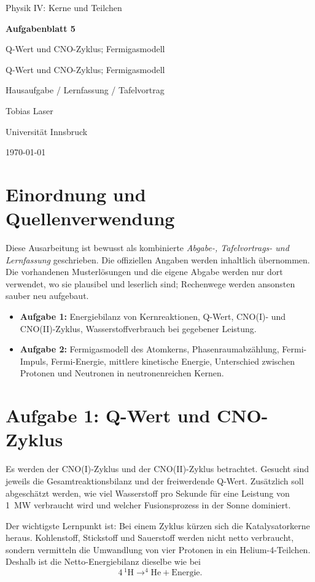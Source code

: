 \documentclass[11pt,a4paper]{scrartcl}
\newcommand{\CourseTitle}{Physik IV: Kerne und Teilchen}
\newcommand{\DocumentKind}{Hausaufgabe / Lernfassung / Tafelvortrag}
\newcommand{\DocumentTitle}{Aufgabenblatt 5}
\newcommand{\DocumentSubtitle}{Q-Wert und CNO-Zyklus; Fermigasmodell}
\newcommand{\AuthorName}{Tobias Laser}
\newcommand{\InstitutionName}{Universit\"at Innsbruck}
\newcommand{\SubmissionDate}{\today}
\newcommand{\makeuniversitytitle}{%
    \begin{titlepage}
        \centering
        \vspace*{2cm}
        {\Large \CourseTitle\par}
        \vspace{1.2cm}
        {\huge\bfseries \DocumentTitle\par}
        \ifx\DocumentSubtitle\empty\else
            \vspace{0.4cm}
            {\Large \DocumentSubtitle\par}
        \fi
        \vspace{1cm}
        {\Large \DocumentKind\par}
        \vfill
        {\large \AuthorName\par}
        \vspace{0.2cm}
        {\large \InstitutionName\par}
        \vspace{0.8cm}
        {\large \SubmissionDate\par}
    \end{titlepage}
    \pagenumbering{arabic}
}
\newcommand{\isotope}[2]{^{#1}\mathrm{#2}}
\theoremstyle{definition}
\theoremstyle{plain}
\theoremstyle{remark}
\begin{document}
\makeuniversitytitle
\tableofcontents
\newpage

\section*{Einordnung und Quellenverwendung}

Diese Ausarbeitung ist bewusst als kombinierte \emph{Abgabe-, Tafelvortrags- und Lernfassung} geschrieben. Die offiziellen Angaben werden inhaltlich übernommen. Die vorhandenen Musterlösungen und die eigene Abgabe werden nur dort verwendet, wo sie plausibel und leserlich sind; Rechenwege werden ansonsten sauber neu aufgebaut.

\begin{summarybox}[title=Zentrale Themen von Blatt 5]
\begin{itemize}
    \item \textbf{Aufgabe 1:} Energiebilanz von Kernreaktionen, Q-Wert, CNO(I)- und CNO(II)-Zyklus, Wasserstoffverbrauch bei gegebener Leistung.
    \item \textbf{Aufgabe 2:} Fermigasmodell des Atomkerns, Phasenraumabzählung, Fermi-Impuls, Fermi-Energie, mittlere kinetische Energie, Unterschied zwischen Protonen und Neutronen in neutronenreichen Kernen.
\end{itemize}
\end{summarybox}

\section{Aufgabe 1: Q-Wert und CNO-Zyklus}

\begin{taskbox}
Es werden der CNO(I)-Zyklus und der CNO(II)-Zyklus betrachtet. Gesucht sind jeweils die Gesamtreaktionsbilanz und der freiwerdende Q-Wert. Zusätzlich soll abgeschätzt werden, wie viel Wasserstoff pro Sekunde für eine Leistung von \SI{1}{MW} verbraucht wird und welcher Fusionsprozess in der Sonne dominiert.
\end{taskbox}

\begin{learnbox}
Der wichtigste Lernpunkt ist: Bei einem Zyklus kürzen sich die Katalysatorkerne heraus. Kohlenstoff, Stickstoff und Sauerstoff werden nicht netto verbraucht, sondern vermitteln die Umwandlung von vier Protonen in ein Helium-4-Teilchen. Deshalb ist die Netto-Energiebilanz dieselbe wie bei
\[
    4\,\isotope{1}{H} \longrightarrow \isotope{4}{He} + \text{Energie}.
\]
\end{learnbox}
\end{document}
